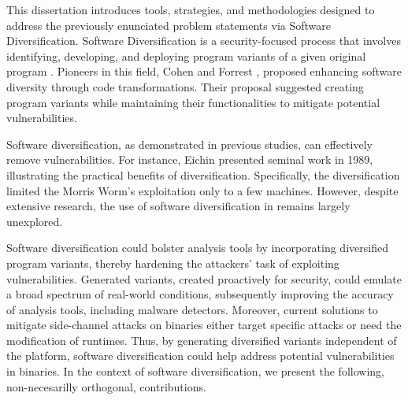 \begin{comment}
\msection{Problem statement}

\end{comment}


This dissertation introduces tools, strategies, and methodologies designed to address the previously enunciated problem statements via Software Diversification.
Software Diversification is a security-focused process that involves identifying, developing, and deploying program variants of a given original program \cite{okhravi2013survey}.
Pioneers in this field, Cohen \etal \cite{cohen1993operating} and Forrest \etal \cite{595185}, proposed enhancing software diversity through code transformations. 
Their proposal suggested creating program variants while maintaining their functionalities to mitigate potential vulnerabilities.

Software diversification, as demonstrated in previous studies, can effectively remove vulnerabilities. 
For instance, Eichin \etal \cite{36307} presented seminal work in 1989, illustrating the practical benefits of diversification. 
Specifically, the diversification limited the Morris Worm's exploitation only to a few machines. 
However, despite extensive research, the use of software diversification in \Wasm remains largely unexplored. 


Software diversification could bolster \Wasm analysis tools by incorporating diversified program variants, thereby hardening the attackers' task of exploiting vulnerabilities. 
Generated variants, created proactively for security, could emulate a broad spectrum of real-world conditions, subsequently improving the accuracy of \Wasm analysis tools, including \Wasm malware detectors. 
Moreover, current solutions to mitigate side-channel attacks on \Wasm binaries either target specific attacks or need the modification of runtimes. 
Thus, by generating diversified variants independent of the platform, software diversification could help address potential vulnerabilities in \Wasm binaries. 
In the context of software diversification, we present the following, non-necesarilly orthogonal, contributions.

